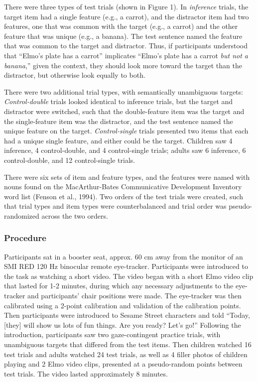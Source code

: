 \documentclass[a4paper,man,apacite,floatsintext]{apa6}
\begin{document}
There were three types of test trials (shown in Figure 1). In
\emph{inference} trials, the target item had a single feature (e.g., a
carrot), and the distractor item had two features, one that was common
with the target (e.g., a carrot) and the other feature that was unique
(e.g., a banana). The test sentence named the feature that was common to
the target and distractor. Thus, if participants understood that
``Elmo's plate has a carrot'' implicates ``Elmo's plate has a carrot
\emph{but not a banana},'' given the context, they should look more
toward the target than the distractor, but otherwise look equally to
both.

There were two additional trial types, with semantically unambiguous
targets: \emph{Control-double} trials looked identical to inference
trials, but the target and distractor were switched, such that the
double-feature item was the target and the single-feature item was the
distractor, and the test sentence named the unique feature on the
target. \emph{Control-single} trials presented two items that each had a
unique single feature, and either could be the target. Children saw 4
inference, 4 control-double, and 4 control-single trials; adults saw 6
inference, 6 control-double, and 12 control-single trials.

There were six sets of item and feature types, and the features were
named with nouns found on the MacArthur-Bates Communicative Development
Inventory word list (Fenson et al., 1994). Two orders of the test trials
were created, such that trial types and item types were counterbalanced
and trial order was pseudo-randomized across the two orders.

\subsubsection{Procedure}\label{procedure}

Participants sat in a booster seat, approx. 60 cm away from the monitor
of an SMI RED 120 Hz binocular remote eye-tracker. Participants were
introduced to the task as watching a short video. The video began with a
short Elmo video clip that lasted for 1-2 minutes, during which any
necessary adjustments to the eye-tracker and participants' chair
positions were made. The eye-tracker was then calibrated using a 2-point
calibration and validation of the calibration points. Then participants
were introduced to Sesame Street characters and told ``Today, {[}they{]}
will show us lots of fun things. Are you ready? Let's go!'' Following
the introduction, participants saw two gaze-contingent practice trials,
with unambiguous targets that differed from the test items. Then
children watched 16 test trials and adults watched 24 test trials, as
well as 4 filler photos of children playing and 2 Elmo video clips,
presented at a pseudo-random points between test trials. The video
lasted approximately 8 minutes.
\end{document}

